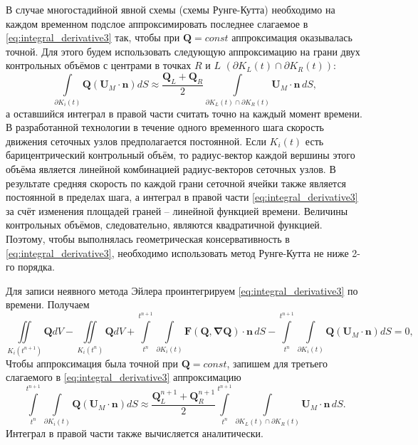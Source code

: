 В случае многостадийной явной схемы (схемы Рунге-Кутта) необходимо на каждом временном подслое аппроксимировать последнее слагаемое в \eqref{eq:integral_derivative3} так, чтобы при $\mathbf{Q} = const$  аппроксимация оказывалась точной. Для этого будем использовать следующую аппроксимацию на грани двух контрольных объёмов с центрами в точках $R$ и $L$ $(\partial K_L(t)\cap\partial K_R(t) )$:
\begin{equation}\label{eq:approx}
\int \limits_{\partial K_i(t)}\mathbf{Q}(\mathbf{U}_M\cdot \mathbf{n})dS \approx \frac{\mathbf{Q}_L + \mathbf{Q}_R}{2} \int \limits_{\partial K_L(t)\cap\partial K_R(t)} \mathbf{U}_M\cdot \mathbf{n}\,dS,
\end{equation}
а оставшийся интеграл в правой части считать точно на каждый момент времени. В разработанной технологии в течение одного временного шага скорость движения сеточных узлов предполагается постоянной. Если $K_i(t)$  есть барицентрический  контрольный объём, то радиус-вектор каждой вершины этого объёма является линейной комбинацией радиус-векторов сеточных узлов. В результате средняя скорость по каждой грани сеточной ячейки также является постоянной в пределах шага, а интеграл в правой части \eqref{eq:integral_derivative3} за счёт изменения площадей граней – линейной функцией времени. Величины контрольных объёмов, следовательно, являются квадратичной функцией. Поэтому, чтобы выполнялась геометрическая консервативность в \eqref{eq:integral_derivative3}, необходимо использовать метод Рунге-Кутта не ниже 2-го порядка.

Для записи неявного метода Эйлера проинтегрируем \eqref{eq:integral_derivative3} по времени. Получаем
\begin{equation}\label{eq:integral_time}
\iint \limits_{K_i(t^{n+1})} \mathbf{Q}dV  - \iint \limits_{K_i(t^{n})} \mathbf{Q}dV+ 
\int \limits_{t^n}^{t^{n+1}} \int \limits_{\partial K_i(t)}\mathbf{F(Q, \nabla Q)} \cdot \mathbf{n} \,dS - 
\int \limits_{t^n}^{t^{n+1}} \int \limits_{\partial K_i(t)}\mathbf{Q}(\mathbf{U}_M\cdot \mathbf{n})dS = 0 ,
\end{equation}
Чтобы аппроксимация была точной при  $\mathbf{Q} = const$, запишем для третьего слагаемого в \eqref{eq:integral_derivative3} аппроксимацию
\begin{equation}\label{eq:approx_time}
\int \limits_{t^n}^{t^{n+1}} \int \limits_{\partial K_i(t)}\mathbf{Q}(\mathbf{U}_M\cdot \mathbf{n})dS \approx \frac{\mathbf{Q}^{n+1}_L + \mathbf{Q}^{n+1}_R}{2} \int \limits_{t^n}^{t^{n+1}} \int \limits_{\partial K_L(t)\cap\partial K_R(t)} \mathbf{U}_M\cdot \mathbf{n}\,dS.
\end{equation}
Интеграл в правой части также вычисляется аналитически.

